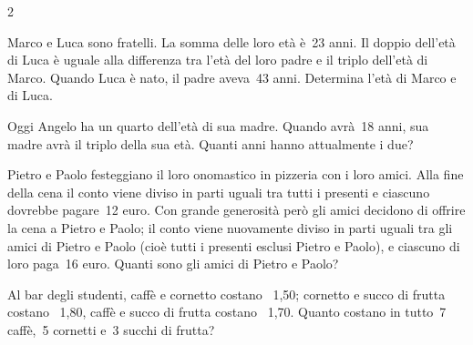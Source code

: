 \begin{htmulticols}{2}
\begin{esercizio}
 \label{ese:22.103}
Marco e Luca sono fratelli. La somma delle loro età è~23
anni. Il doppio dell'età di Luca è uguale alla
differenza tra l'età del loro padre e il triplo
dell'età di Marco. Quando Luca è nato, il padre
aveva~43 anni. Determina l'età di Marco e di Luca.
\end{esercizio}


\begin{esercizio}
 \label{ese:22.104}
Oggi Angelo ha un quarto dell'età di sua
madre. Quando avrà~18 anni, sua madre avrà il triplo della sua
età. Quanti anni hanno attualmente i due?
\end{esercizio}


\begin{esercizio}
 \label{ese:22.105}
 Pietro e Paolo festeggiano il loro onomastico in pizzeria con i
loro amici. Alla fine della cena il conto viene diviso in parti uguali
tra tutti i presenti e ciascuno dovrebbe pagare~12 euro. Con grande
generosità però gli amici decidono di offrire la cena a Pietro e
Paolo; il conto viene nuovamente diviso in parti uguali tra gli amici
di Pietro e Paolo (cioè tutti i presenti esclusi Pietro e Paolo), e
ciascuno di loro paga~16 euro. Quanti sono gli amici di Pietro e Paolo?
\end{esercizio}


\begin{esercizio}[*]
 \label{ese:22.106}
 Al bar degli studenti, caffè e cornetto costano
{\officialeuro}~1,50; cornetto e succo di frutta costano {\officialeuro}~1,80,
caffè e succo di frutta costano {\officialeuro}~1,70. Quanto costano in
tutto~7 caffè,~5 cornetti e~3 succhi di frutta?
\end{esercizio}


\end{htmulticols}
